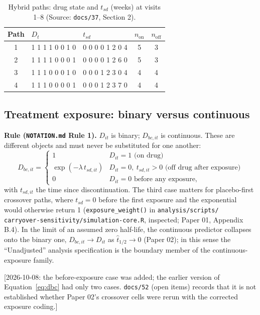 \documentclass[11pt]{article}
\newcommand{\note}[1]{\textcolor{blue!60!black}{\small [#1]}}
\newcommand{\code}[1]{\texttt{#1}}
\begin{document}
\begin{table}[h]
\centering\small
\caption{Hybrid paths: drug state and $t_{sd}$ (weeks) at visits 1--8
(Source: \code{docs/37}, Section 2).}
\label{tab:cg-paths}
\begin{tabular}{@{}cllcc@{}}
\toprule
Path & $D_t$ & $t_{sd}$ & $n_{\mathrm{on}}$ & $n_{\mathrm{off}}$ \\
\midrule
1 & 1 1 1 1 0 0 1 0 & 0 0 0 0 1 2 0 4 & 5 & 3 \\
2 & 1 1 1 1 0 0 0 1 & 0 0 0 0 1 2 6 0 & 5 & 3 \\
3 & 1 1 1 0 0 0 1 0 & 0 0 0 1 2 3 0 4 & 4 & 4 \\
4 & 1 1 1 0 0 0 0 1 & 0 0 0 1 2 3 7 0 & 4 & 4 \\
\bottomrule
\end{tabular}
\end{table}

\subsection{Treatment exposure: binary versus continuous}

\textbf{Rule (\code{NOTATION.md} Rule 1).} $D_{it}$ is binary;
$D_{bc,it}$ is continuous. These are different objects and must never
be substituted for one another:
\begin{equation}
D_{bc,it} = \begin{cases} 1 & D_{it} = 1 \text{ (on drug)} \\
  \exp(-\lambda\, t_{sd,it}) & D_{it} = 0,\ t_{sd,it} > 0
    \text{ (off drug after exposure)} \\
  0 & D_{it} = 0 \text{ before any exposure},
\end{cases}
\label{eq:dbc}
\end{equation}
with $t_{sd,it}$ the time since discontinuation. The third case
matters for placebo-first crossover paths, where $t_{sd} = 0$ before
the first exposure and the exponential would otherwise return 1
(\code{exposure\_weight()} in
\code{analysis/\allowbreak scripts/\allowbreak
carryover-sensitivity/\allowbreak simulation-core.R},
inspected; Paper 01, Appendix B.4). In the limit of an assumed zero
half-life, the continuous predictor collapses onto the binary one,
$D_{bc,it} \to D_{it}$ as $\hat t_{1/2} \to 0$ (Paper 02); in this
sense the ``Unadjusted'' analysis specification is the boundary member
of the continuous-exposure family.

\note{2026-10-08: the before-exposure case was added; the earlier
version of Equation~\eqref{eq:dbc} had only two cases. \code{docs/52}
(open items) records that it is not established whether Paper 02's
crossover cells were rerun with the corrected exposure coding.}
\end{document}
